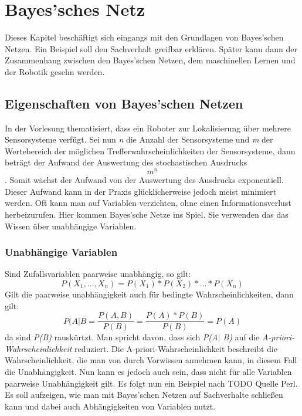 \chapter{Bayes'sches Netz}
Dieses Kapitel beschäftigt sich eingangs mit den Grundlagen von Bayes'schen Netzen. Ein Beispiel soll den Sachverhalt greifbar erklären.
Später kann dann der Zusammenhang zwischen den Bayes'schen Netzen, dem maschinellen Lernen und der Robotik gesehn werden.
\section{Eigenschaften von Bayes'schen Netzen}
In der Vorlesung thematisiert, dass ein Roboter zur Lokalisierung über mehrere Sensorsysteme verfügt. Sei nun \textit{n} die Anzahl der Sensorsysteme und \textit{m} der Wertebereich der möglichen Trefferwahrscheinlichkeiten der Sensorsysteme, dann beträgt der Aufwand der Auswertung des stochastischen Ausdrucks \[ m^n\]. Somit wächst der Aufwand von der Auswertung des Ausdrucks exponentiell. Dieser Aufwand kann in der Praxis glücklicherweise jedoch meist minimiert werden. Oft kann man auf Variablen verzichten, ohne einen Informationsverlust herbeizurufen. Hier kommen Bayes'sche Netze ins Spiel. Sie verwenden das das Wissen über unabhängige Variablen. 
\subsection{Unabhängige Variablen}
Sind Zufallsvariablen paarweise unabhängig, so gilt: \[ P(X_1, ..., X_n) = P(X_1) * P(X_2) * ... * P(X_n)\] 
Gilt die paarweise unabhängigkeit auch für bedingte Wahrscheinlichkeiten, dann gilt: \[ P(A\vert B = \frac{P(A,B)}{P(B)} = \frac{P(A) * P(B)}{P(B)}  = P(A) \] da sind \textit{P(B)} rauskürtzt. Man spricht davon, dass sich \textit{P(A$\vert$ B)} auf die \textit{A-priori-Wahrscheinlichkeit} reduziert. Die A-priori-Wahrscheinlichkeit beschreibt die Wahrscheinlichkeit, die man von durch Vorwissen annehmen kann, in diesem Fall die Unabhängigkeit. Nun kann es jedoch auch sein, dass nicht für alle Variablen paarweise Unabhängigkeit gilt. Es folgt nun ein Beispiel nach TODO Quelle Perl. Es soll aufzeigen, wie man mit Bayes'schen Netzen auf Sachverhalte schließen kann und dabei auch Abhängigkeiten von Variablen nutzt. 

